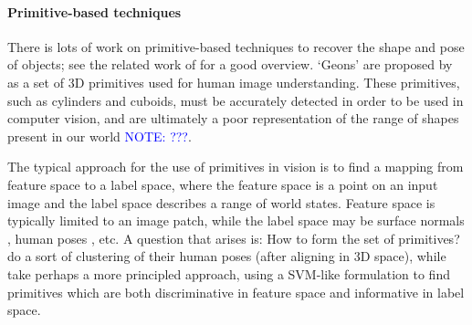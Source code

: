 \documentclass[10pt,twocolumn,letterpaper]{article}
\newcommand{\note}[1]{\textcolor{blue}{NOTE: #1}}
\begin{document}
\paragraph{Primitive-based techniques}
There is lots of work on primitive-based techniques to recover the shape and pose of objects; see the related work of \cite{fouhey-iccv-2013} for a good overview.
`Geons' are proposed by \cite{bieberman-rbc-1987} as a set of 3D primitives used for human image understanding. These primitives, such as cylinders and cuboids, must be accurately detected in order to be used in computer vision, and are ultimately a poor representation of the range of shapes present in our world \note{???}.

The typical approach for the use of primitives in vision is to find a mapping from feature space to a label space, where the feature space is a point on an input image and the label space describes a range of world states. 
Feature space is typically limited to an image patch, while the label space may be surface normals \cite{fouhey-iccv-2013}, human poses \cite{bourdev-iccv-2009}, etc.
A question that arises is: How to form the set of primitives?
\cite{bourdev-iccv-2009} do a sort of clustering of their human poses (after aligning in 3D space), while \cite{fouhey-iccv-2013} take perhaps a more principled approach, using a SVM-like formulation to find primitives which are both discriminative in feature space and informative in label space.












\end{document}
